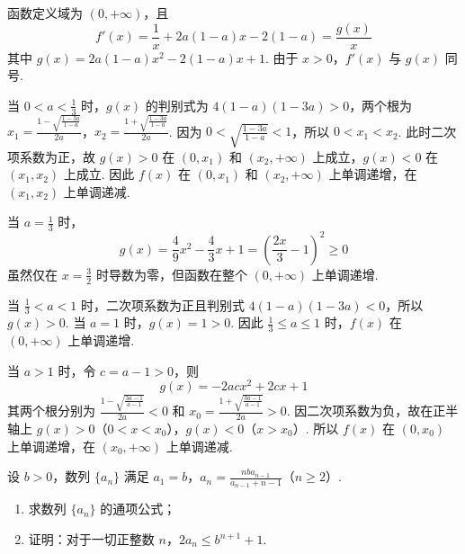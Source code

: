 \begin{solution}
函数定义域为 \((0,+\infty)\)，且
\[
f'(x)=\frac1x+2a(1-a)x-2(1-a)=\frac{g(x)}{x}
\]
其中 \(g(x)=2a(1-a)x^2-2(1-a)x+1\).
由于 \(x>0\)，\(f'(x)\) 与 \(g(x)\) 同号.

当 \(0<a<\frac13\) 时，\(g(x)\) 的判别式为 \(4(1-a)(1-3a)>0\)，两个根为
\(x_1=\frac{1-\sqrt{\frac{1-3a}{1-a}}}{2a}\)，\(x_2=\frac{1+\sqrt{\frac{1-3a}{1-a}}}{2a}\).
因为 \(0<\sqrt{\frac{1-3a}{1-a}}<1\)，所以 \(0<x_1<x_2\). 此时二次项系数为正，故 \(g(x)>0\) 在 \((0,x_1)\) 和 \((x_2,+\infty)\) 上成立，\(g(x)<0\) 在 \((x_1,x_2)\) 上成立. 因此 \(f(x)\) 在 \((0,x_1)\) 和 \((x_2,+\infty)\) 上单调递增，在 \((x_1,x_2)\) 上单调递减.

当 \(a=\frac13\) 时，
\[
g(x)=\frac49x^2-\frac43x+1=\left(\frac{2x}{3}-1\right)^2\geqslant0
\]
虽然仅在 \(x=\frac32\) 时导数为零，但函数在整个 \((0,+\infty)\) 上单调递增.

当 \(\frac13<a<1\) 时，二次项系数为正且判别式 \(4(1-a)(1-3a)<0\)，所以 \(g(x)>0\). 当 \(a=1\) 时，\(g(x)=1>0\). 因此 \(\frac13\leqslant a\leqslant1\) 时，\(f(x)\) 在 \((0,+\infty)\) 上单调递增.

当 \(a>1\) 时，令 \(c=a-1>0\)，则
\[
g(x)=-2acx^2+2cx+1
\]
其两个根分别为 \(\frac{1-\sqrt{\frac{3a-1}{a-1}}}{2a}<0\) 和 \(x_0=\frac{1+\sqrt{\frac{3a-1}{a-1}}}{2a}>0\).
因二次项系数为负，故在正半轴上 \(g(x)>0\)（\(0<x<x_0\)），\(g(x)<0\)（\(x>x_0\)）. 所以 \(f(x)\) 在 \((0,x_0)\) 上单调递增，在 \((x_0,+\infty)\) 上单调递减.
\end{solution}

\begin{problem}
设 \(b > 0\)，数列 \(\{a_{n}\}\) 满足 \(a_{1} = b\)，\(a_{n} = \frac{nba_{n - 1}}{a_{n - 1} + n - 1} \)（\(n \geqslant 2\)）.
\begin{enumerate}
\item 求数列 \( \{a_{n}\} \) 的通项公式；
\item 证明：对于一切正整数 \(n\)，\(2a_{n} \leqslant b^{n+1} + 1\).
\end{enumerate}
\end{problem}


